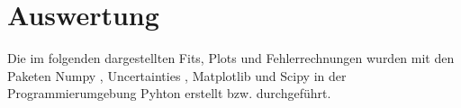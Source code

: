 \section{Auswertung}
\label{sec:Auswertung}




Die im folgenden dargestellten Fits, Plots und Fehlerrechnungen wurden mit den Paketen Numpy \cite{numpy}, Uncertainties \cite{uncertainties}, Matplotlib \cite{matplotlib} und Scipy \cite{scipy} in der Programmierumgebung Pyhton erstellt bzw. durchgeführt.
